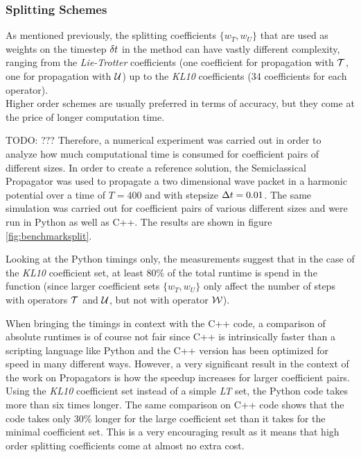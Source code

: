 \subsubsection{Splitting Schemes}
%
As mentioned previously, the splitting coefficients $\{ w_T, w_U \}$ that are used as weights on the timestep $\delta t$ in the  method can have vastly different complexity, ranging from the \emph{Lie-Trotter} coefficients (one coefficient for propagation with $\mathcal{T}$, one for propagation with $\mathcal{U}$) up to the \emph{KL10} coefficients (34 coefficients for each operator). \\
Higher order schemes are usually preferred in terms of accuracy, but they come at the price of longer computation time.
\par\medskip
%
\Huge{TODO: ???}
Therefore, a numerical experiment was carried out in order to analyze how much computational time is consumed for coefficient pairs of different sizes.
In order to create a reference solution, the Semiclassical Propagator was used to propagate a two dimensional wave packet in a harmonic potential over a time of $T = 400$ and with stepsize $\Delta t = 0.01$.
The same simulation was carried out for coefficient pairs of various different sizes and were run in Python as well as C++.
The results are shown in figure \ref{fig:benchmarksplit}.
\par\medskip
%
Looking at the Python timings only, the measurements suggest that in the case of the \emph{KL10} coefficient set, at least 80\% of the total runtime is spend in the  function (since larger coefficient sets $\{ w_T, w_U \}$ only affect the number of steps with operators $\mathcal{T}$ and $\mathcal{U}$, but not with operator $\mathcal{W}$).
\par\medskip
%
When bringing the timings in context with the C++ code, a comparison of absolute runtimes is of course not fair since C++ is intrinsically faster than a scripting language like Python and the C++ version has been optimized for speed in many different ways.
However, a very significant result in the context of the work on Propagators is how the speedup increases for larger coefficient pairs.
Using the \emph{KL10} coefficient set instead of a simple \emph{LT} set, the Python code takes more than six times longer.
The same comparison on C++ code shows that the code takes only 30\% longer for the large coefficient set than it takes for the minimal coefficient set.
This is a very encouraging result as it means that high order splitting coefficients come at almost no extra cost.
\par\medskip

